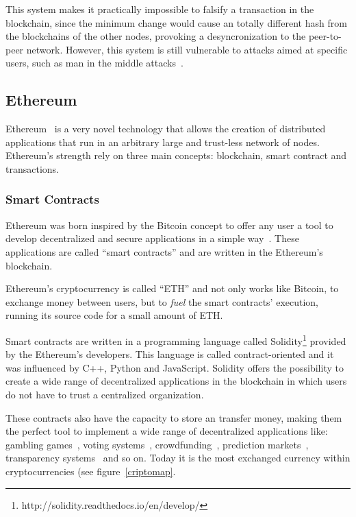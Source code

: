 This system makes it practically impossible to falsify a transaction in the
blockchain, since the minimum change would cause an totally different hash from
the blockchains of the other nodes, provoking a desyncronization to the
peer-to-peer network. However, this system is still vulnerable to attacks aimed
at specific users, such as man in the middle attacks~\cite{moore2013beware}.

\subsection{Ethereum}
\label{tb:eth}
Ethereum~\cite{buterin2014ethereum} is a very novel technology that allows the
creation of distributed applications that run in an arbitrary large and
trust-less network of nodes. Ethereum's strength rely on three main concepts:
blockchain, smart contract and transactions.

\subsubsection*{Smart Contracts}
\label{tb:cryptos:sm}

Ethereum was born inspired by the Bitcoin concept to offer any user a tool to
develop decentralized and secure applications in a simple
way~\cite{buterin2014ethereum}. These applications are called ``smart
contracts'' and are written in the Ethereum's blockchain.

Ethereum's cryptocurrency is called ``ETH'' and not only works like Bitcoin, to
exchange money between users, but to \emph{fuel} the smart contracts' execution,
running its source code for a small amount of ETH.

Smart contracts are written in a programming language called
Solidity\footnote{http://solidity.readthedocs.io/en/develop/} provided by the
Ethereum's developers. This language is called contract-oriented and it was
influenced by C++, Python and JavaScript. Solidity offers the possibility to
create a wide range of decentralized applications in the blockchain in which
users do not have to trust a centralized organization.

These contracts also have the capacity to store an transfer money, making them
the perfect tool to implement a wide range of decentralized applications like:
gambling games~\cite{piasecki2016gaming}, voting
systems~\cite{mccorry2017smart}, crowdfunding~\cite{jacynycz2016betfunding},
prediction markets~\cite{peterson2015augur}, transparency
systems~\cite{bonneau2016ethiks} and so on. Today it is the most exchanged
currency within cryptocurrencies (see
figure~\ref{criptomap}.

